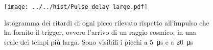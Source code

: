 \begin{figure}[h] \centering \texttt{[image: ../../hist/Pulse\_delay\_large.pdf]}\caption{Istogramma dei ritardi di ogni picco rilevato rispetto all'impulso che ha fornito il trigger, ovvero l'arrivo di un raggio cosmico, in una scale dei tempi più larga. Sono visibili i picchi a \SI{5}{\micro\second} e a \SI{20}{\micro\second}}\label{hist:Pulse_delay_large} \end{figure}
